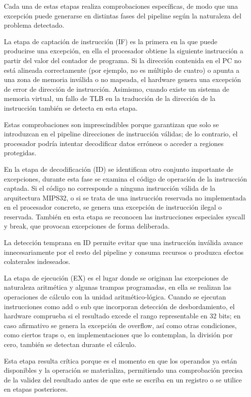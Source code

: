 \documentclass[12pt, letterpaper]{article}
\begin{document}
 Cada una de estas etapas realiza comprobaciones específicas, de modo que una excepción puede generarse en distintas fases del pipeline según la naturaleza del problema detectado.

 La etapa de captación de instrucción (IF) es la primera en la que puede producirse una excepción, en ella el procesador obtiene la siguiente instrucción a partir del valor del contador de programa. Si la dirección contenida en el PC no está alineada correctamente (por ejemplo, no es múltiplo de cuatro) o apunta a una zona de memoria inválida o no mapeada, el hardware genera una excepción de error de dirección de instrucción. Asimismo, cuando existe un sistema de memoria virtual, un fallo de TLB en la traducción de la dirección de la instrucción también se detecta en esta etapa.

 Estas comprobaciones son imprescindibles porque garantizan que solo se introduzcan en el pipeline direcciones de instrucción válidas; de lo contrario, el procesador podría intentar decodificar datos erróneos o acceder a regiones protegidas.

 En la etapa de decodificación (ID) se identifican otro conjunto importante de excepciones, durante esta fase se examina el código de operación de la instrucción captada. Si el código no corresponde a ninguna instrucción válida de la arquitectura MIPS32, o si se trata de una instrucción reservada no implementada en el procesador concreto, se genera una excepción de instrucción ilegal o reservada. También en esta etapa se reconocen las instrucciones especiales syscall y break, que provocan excepciones de forma deliberada.

 La detección temprana en ID permite evitar que una instrucción inválida avance innecesariamente por el resto del pipeline y consuma recursos o produzca efectos colaterales indeseados.

 La etapa de ejecución (EX) es el lugar donde se originan las excepciones de naturaleza aritmética y algunas trampas programadas, en ella se realizan las operaciones de cálculo con la unidad aritmético-lógica. Cuando se ejecutan instrucciones como add o sub que incorporan detección de desbordamiento, el hardware comprueba si el resultado excede el rango representable en 32 bits; en caso afirmativo se genera la excepción de overflow, así como otras condiciones, como ciertos traps o, en implementaciones que lo contemplan, la división por cero, también se detectan durante el cálculo.

 Esta etapa resulta crítica porque es el momento en que los operandos ya están disponibles y la operación se materializa, permitiendo una comprobación precisa de la validez del resultado antes de que este se escriba en un registro o se utilice en etapas posteriores.
\end{document}
